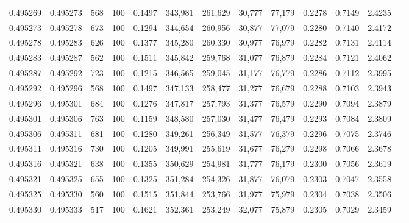 \begin{tabular}{rrrrrrrrrrrrr}
0.495269 & 0.495273 &   568 & 100 &                                     0.1497 & 343,981 & 261,629 &  30,777 &  77,179 & 0.2278 & 0.7149 & 2.4235 \\
0.495273 & 0.495278 &   673 & 100 &                                     0.1294 & 344,654 & 260,956 &  30,877 &  77,079 & 0.2280 & 0.7140 & 2.4172 \\
0.495278 & 0.495283 &   626 & 100 &                                     0.1377 & 345,280 & 260,330 &  30,977 &  76,979 & 0.2282 & 0.7131 & 2.4114 \\
0.495283 & 0.495287 &   562 & 100 &                                     0.1511 & 345,842 & 259,768 &  31,077 &  76,879 & 0.2284 & 0.7121 & 2.4062 \\
0.495287 & 0.495292 &   723 & 100 &                                     0.1215 & 346,565 & 259,045 &  31,177 &  76,779 & 0.2286 & 0.7112 & 2.3995 \\
0.495292 & 0.495296 &   568 & 100 &                                     0.1497 & 347,133 & 258,477 &  31,277 &  76,679 & 0.2288 & 0.7103 & 2.3943 \\
0.495296 & 0.495301 &   684 & 100 &                                     0.1276 & 347,817 & 257,793 &  31,377 &  76,579 & 0.2290 & 0.7094 & 2.3879 \\
0.495301 & 0.495306 &   763 & 100 &                                     0.1159 & 348,580 & 257,030 &  31,477 &  76,479 & 0.2293 & 0.7084 & 2.3809 \\
0.495306 & 0.495311 &   681 & 100 &                                     0.1280 & 349,261 & 256,349 &  31,577 &  76,379 & 0.2296 & 0.7075 & 2.3746 \\
0.495311 & 0.495316 &   730 & 100 &                                     0.1205 & 349,991 & 255,619 &  31,677 &  76,279 & 0.2298 & 0.7066 & 2.3678 \\
0.495316 & 0.495321 &   638 & 100 &                                     0.1355 & 350,629 & 254,981 &  31,777 &  76,179 & 0.2300 & 0.7056 & 2.3619 \\
0.495321 & 0.495325 &   655 & 100 &                                     0.1325 & 351,284 & 254,326 &  31,877 &  76,079 & 0.2303 & 0.7047 & 2.3558 \\
0.495325 & 0.495330 &   560 & 100 &                                     0.1515 & 351,844 & 253,766 &  31,977 &  75,979 & 0.2304 & 0.7038 & 2.3506 \\
0.495330 & 0.495333 &   517 & 100 &                                     0.1621 & 352,361 & 253,249 &  32,077 &  75,879 & 0.2305 & 0.7029 & 2.3459 \\

\end{tabular}
